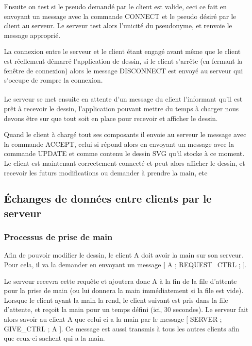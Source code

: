 \documentclass[a4paper,10pt]{article}
\begin{document}
Ensuite on test si le pseudo demandé par le client est valide, ceci ce fait en envoyant un message avec la commande CONNECT et le pseudo désiré par le client au serveur. Le serveur test alors l'unicité du pseudonyme, et renvoie le message approprié.

La connexion entre le serveur et le client étant engagé avant même que le client est réellement démarré l'application de dessin, si le client s'arrête (en fermant la fenêtre de connexion) alors le message DISCONNECT est envoyé au serveur qui s'occupe de rompre la connexion.


\paragraph{}Le serveur se met ensuite en attente d'un message du client l'informant qu'il est prêt à recevoir le dessin, l'application pouvant mettre du temps à charger nous devons être sur que tout soit en place pour recevoir et afficher le dessin.

Quand le client à chargé tout ses composants il envoie au serveur le message avec la commande ACCEPT, celui si répond alors en envoyant un message avec la commande UPDATE et comme contenu le dessin SVG qu'il stocke à ce moment. Le client est maintenant correctement connecté et peut alors afficher le dessin, et recevoir les futurs modifications ou demander à prendre la main, etc

\subsection{Échanges de données entre clients par le serveur}
\subsubsection{Processus de prise de main}
Afin de pouvoir modifier le dessin, le client A doit avoir la main sur son serveur. Pour cela, il va la demander en envoyant un message [ A ; REQUEST\_CTRL ; ].

Le serveur recevra cette requête et ajoutera donc A à la fin de la file d'attente pour la prise de main (ou lui donnera la main immédiatement si la file est vide). Lorsque le client ayant la main la rend, le client suivant est pris dans la file d'attente, et reçoit la main pour un temps défini (ici, 30 secondes). Le serveur fait alors savoir au client A que celui-ci a la main par le message [ SERVER ; GIVE\_CTRL ; A ]. Ce message est aussi transmis à tous les autres clients afin que ceux-ci sachent qui a la main.
\end{document}
